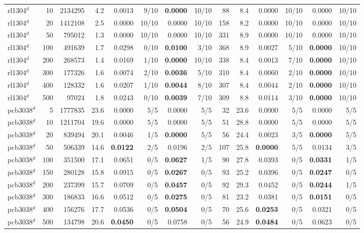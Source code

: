 \begin{tabular}{lrr@{\hskip 10pt}rrrrr@{\hskip 10pt}rrrrrr}
rl1304$^{d}$ & 10 & 2134295 & 4.2 & 0.0013 & 9/10 & \textbf{0.0000} & 10/10 & 88 & 8.4 & 0.0000 & 10/10 & 0.0000 & 10/10 \\
rl1304$^{d}$ & 20 & 1412108 & 2.5 & 0.0000 & 10/10 & 0.0000 & 10/10 & 158 & 8.2 & 0.0000 & 10/10 & 0.0000 & 10/10 \\
rl1304$^{d}$ & 50 & 795012 & 1.3 & 0.0000 & 10/10 & 0.0000 & 10/10 & 331 & 8.9 & 0.0000 & 10/10 & 0.0000 & 10/10 \\
rl1304$^{d}$ & 100 & 491639 & 1.7 & 0.0298 & 0/10 & \textbf{0.0100} & 3/10 & 368 & 8.9 & 0.0027 & 5/10 & \textbf{0.0000} & 10/10 \\
rl1304$^{d}$ & 200 & 268573 & 1.4 & 0.0169 & 1/10 & \textbf{0.0000} & 10/10 & 338 & 8.4 & 0.0013 & 7/10 & \textbf{0.0000} & 10/10 \\
rl1304$^{d}$ & 300 & 177326 & 1.6 & 0.0074 & 2/10 & \textbf{0.0036} & 5/10 & 310 & 8.4 & 0.0060 & 2/10 & \textbf{0.0000} & 10/10 \\
rl1304$^{d}$ & 400 & 128332 & 1.6 & 0.0207 & 1/10 & \textbf{0.0044} & 8/10 & 307 & 8.4 & 0.0044 & 2/10 & \textbf{0.0000} & 10/10 \\
rl1304$^{d}$ & 500 & 97024 & 1.8 & 0.0243 & 0/10 & \textbf{0.0039} & 7/10 & 309 & 8.8 & 0.0114 & 3/10 & \textbf{0.0000} & 10/10 \\
\addlinespace[2pt]
pcb3038$^{d}$ & 5 & 1777835 & 23.6 & 0.0000 & 5/5 & 0.0000 & 5/5 & 32 & 23.6 & 0.0000 & 5/5 & 0.0000 & 5/5 \\
pcb3038$^{d}$ & 10 & 1211704 & 19.6 & 0.0000 & 5/5 & 0.0000 & 5/5 & 51 & 28.8 & 0.0000 & 5/5 & 0.0000 & 5/5 \\
pcb3038$^{d}$ & 20 & 839494 & 20.1 & 0.0046 & 1/5 & \textbf{0.0000} & 5/5 & 56 & 24.4 & 0.0023 & 3/5 & \textbf{0.0000} & 5/5 \\
pcb3038$^{d}$ & 50 & 506339 & 14.6 & \textbf{0.0122} & 2/5 & 0.0196 & 2/5 & 107 & 25.8 & \textbf{0.0000} & 5/5 & 0.0134 & 3/5 \\
pcb3038$^{d}$ & 100 & 351500 & 17.1 & 0.0651 & 0/5 & \textbf{0.0627} & 1/5 & 90 & 27.8 & 0.0393 & 0/5 & \textbf{0.0331} & 1/5 \\
pcb3038$^{d}$ & 150 & 280128 & 15.8 & 0.0915 & 0/5 & \textbf{0.0267} & 0/5 & 93 & 25.2 & 0.0396 & 0/5 & \textbf{0.0247} & 0/5 \\
pcb3038$^{d}$ & 200 & 237399 & 15.7 & 0.0709 & 0/5 & \textbf{0.0457} & 0/5 & 92 & 29.3 & 0.0452 & 0/5 & \textbf{0.0244} & 1/5 \\
pcb3038$^{d}$ & 300 & 186833 & 16.6 & 0.0512 & 0/5 & \textbf{0.0275} & 0/5 & 81 & 23.2 & 0.0381 & 0/5 & \textbf{0.0151} & 0/5 \\
pcb3038$^{d}$ & 400 & 156276 & 17.7 & 0.0536 & 0/5 & \textbf{0.0504} & 0/5 & 70 & 25.6 & \textbf{0.0253} & 0/5 & 0.0321 & 0/5 \\
pcb3038$^{d}$ & 500 & 134798 & 20.6 & \textbf{0.0450} & 0/5 & 0.0758 & 0/5 & 56 & 24.9 & \textbf{0.0484} & 0/5 & 0.0623 & 0/5 \\
\bottomrule
\end{tabular}